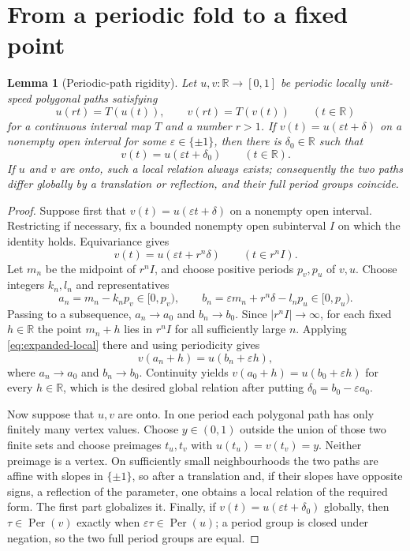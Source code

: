 \documentclass[11pt]{article}
\newtheorem{lemma}[theorem]{Lemma}
\newcommand{\I}{[0,1]}
\begin{document}
\section{From a periodic fold to a fixed point}

\begin{lemma}[Periodic-path rigidity]\label{lem:path-rigidity}
Let $u,v:\mathbb R\to\I$ be periodic locally unit-speed polygonal paths satisfying
\[
u(rt)=T(u(t)),\qquad v(rt)=T(v(t))\qquad(t\in\mathbb R)
\]
for a continuous interval map $T$ and a number $r>1$.
If $v(t)=u(\varepsilon t+\delta)$ on a nonempty open interval for some
$\varepsilon\in\{\pm1\}$, then there is $\delta_0\in\mathbb R$ such that
\[
v(t)=u(\varepsilon t+\delta_0)\qquad(t\in\mathbb R).
\]
If $u$ and $v$ are onto, such a local relation always exists; consequently the two paths differ globally
by a translation or reflection, and their full period groups coincide.
\end{lemma}

\begin{proof}
Suppose first that $v(t)=u(\varepsilon t+\delta)$ on a nonempty open interval. Restricting if necessary,
fix a bounded nonempty open subinterval $I$ on which the identity holds. Equivariance gives
\begin{equation}\label{eq:expanded-local}
v(t)=u(\varepsilon t+r^n\delta)\qquad(t\in r^nI).
\end{equation}
Let $m_n$ be the midpoint of $r^nI$, and choose positive periods $p_v,p_u$ of $v,u$. Choose integers
$k_n,l_n$ and representatives
\[
a_n=m_n-k_np_v\in[0,p_v),\qquad
b_n=\varepsilon m_n+r^n\delta-l_np_u\in[0,p_u).
\]
Passing to a subsequence, $a_n\to a_0$ and $b_n\to b_0$. Since $|r^nI|\to\infty$, for each
fixed $h\in\mathbb R$ the point $m_n+h$ lies in $r^nI$ for all sufficiently large $n$. Applying
\eqref{eq:expanded-local} there and using periodicity gives
\[
v(a_n+h)=u(b_n+\varepsilon h),
\]
where $a_n\to a_0$ and $b_n\to b_0$. Continuity yields
$v(a_0+h)=u(b_0+\varepsilon h)$ for every $h\in\mathbb R$, which is the desired global relation after
putting $\delta_0=b_0-\varepsilon a_0$.

Now suppose that $u,v$ are onto. In one period each polygonal path has only finitely many vertex values.
Choose $y\in(0,1)$ outside the union of those two finite sets and choose preimages $t_u,t_v$ with
$u(t_u)=v(t_v)=y$. Neither preimage is a vertex. On sufficiently small neighbourhoods the two paths are
affine with slopes in $\{\pm1\}$, so after a translation and, if their slopes have opposite signs, a
reflection of the parameter, one obtains a local relation of the required form. The first part globalizes it.
Finally, if $v(t)=u(\varepsilon t+\delta_0)$ globally, then
$\tau\in\operatorname{Per}(v)$ exactly when $\varepsilon\tau\in\operatorname{Per}(u)$; a period group is
closed under negation, so the two full period groups are equal.
\end{proof}
\end{document}
